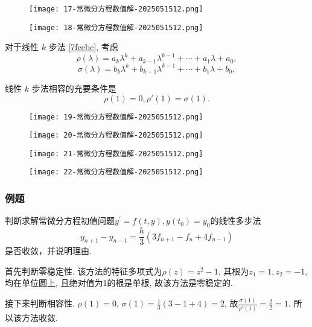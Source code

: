 \begin{figure}[H]
\centering
\texttt{[image: 17-常微分方程数值解-2025051512.png]}
\label{}
\end{figure}
\begin{figure}[H]
\centering
\texttt{[image: 18-常微分方程数值解-2025051512.png]}
\label{}
\end{figure}

对于线性 $k$ 步法 \cref{7fcebc}, 考虑
\[
\rho(\lambda) = a_k \lambda^k + a_{k-1} \lambda^{k-1} + \cdots + a_1 \lambda + a_0,
\]
\[
\sigma(\lambda) = b_k \lambda^k + b_{k-1} \lambda^{k-1} + \cdots + b_1 \lambda + b_0,
\]
\begin{theorem}[相容条件]
线性 $k$ 步法相容的充要条件是
\[
\rho(1) = 0, \rho'(1) = \sigma(1).
\]
\end{theorem}
\begin{figure}[H]
\centering
\texttt{[image: 19-常微分方程数值解-2025051512.png]}
\label{}
\end{figure}
\begin{figure}[H]
\centering
\texttt{[image: 20-常微分方程数值解-2025051512.png]}
\label{}
\end{figure}

\begin{figure}[H]
\centering
\texttt{[image: 21-常微分方程数值解-2025051512.png]}
\label{}
\end{figure}
\begin{figure}[H]
\centering
\texttt{[image: 22-常微分方程数值解-2025051512.png]}
\label{}
\end{figure}

\subsubsection{例题}

\begin{example}
判断求解常微分方程初值问题$y^\prime=f(t,y),y(t_0)=y_0$的线性多步法
\[
y_{n+1}-y_{n-1}=\frac h3(3f_{n+1}-f_n+4f_{n-1})
\]是否收敛，并说明理由.
\end{example}
首先判断零稳定性.
该方法的特征多项式为$\rho(z)=z^2-1$, 其根为$z_1=1, z_2=-1$, 均在单位圆上, 且绝对值为1的根是单根, 故该方法是零稳定的.

接下来判断相容性.
$\rho(1)=0$, $\sigma(1)=\frac{1}{3}(3-1+4)=2$, 故$\frac{\sigma(1)}{\rho'(1)}=\frac{2}{2}=1$.
所以该方法收敛.
